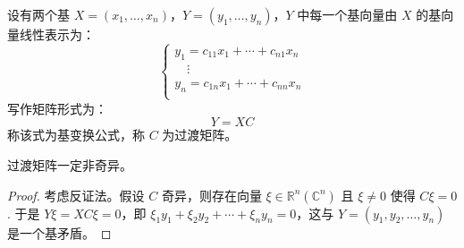 
\begin{definition}[基变换与过渡矩阵]
设有两个基 $X=(x_1,\ldots,x_n)$，$Y=(y_1,\ldots,y_n)$，$Y$ 中每一个基向量由 $X$ 的基向量线性表示为：
\[
    \begin{cases}
    y_1=c_{11}x_1+\cdots+c_{n1}x_n\\
    \quad\vdots\\
    y_n=c_{1n}x_1+\cdots+c_{nn}x_n\\
    \end{cases}
\]
写作矩阵形式为：
\[Y=XC\]
称该式为基变换公式，称 $C$ 为过渡矩阵。
\end{definition}

\begin{corollary}
\label{cor:transmatrix}
过渡矩阵一定非奇异。
\end{corollary}
\begin{proof}
考虑反证法。假设 $C$ 奇异，则存在向量 $\xi\in\mathbb R^n(\mathbb C^n)$ 且 $\xi\neq 0$ 使得 $C\xi=0$. 于是 $Y\xi=XC\xi=0$，即 $\xi_1y_1+\xi_2y_2+\cdots+\xi_ny_n=0$，这与 $Y=(y_1,y_2,\ldots,y_n)$ 是一个基矛盾。
\end{proof}

